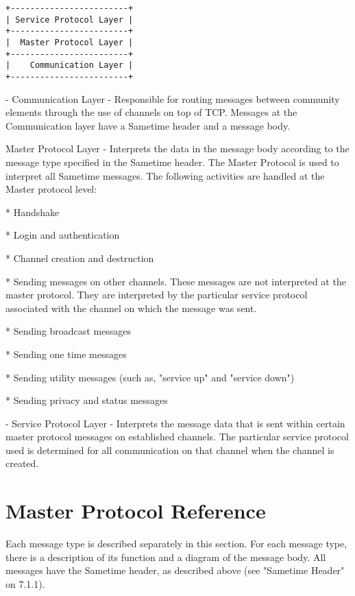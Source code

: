 \documentclass[titlepage,oneside]{book}
\begin{document}
\begin{verbatim}
+------------------------+
| Service Protocol Layer |
+------------------------+
|  Master Protocol Layer |
+------------------------+
|    Communication Layer |
+------------------------+
\end{verbatim}

\par{} - Communication Layer - Responsible for routing messages between
community elements through the use of channels on top of TCP. Messages
at the Communication layer have a Sametime header and a message body.

\par{} Master Protocol Layer - Interprets the data in the message body
according to the message type specified in the Sametime header. The
Master Protocol is used to interpret all Sametime messages. The
following   activities are handled at the Master protocol level:

\par{}     * Handshake
\par{}     * Login and authentication
\par{}     * Channel creation and destruction
\par{}     * Sending messages on other channels. These messages are not
      interpreted at the master protocol. They are interpreted by
      the particular service protocol associated with the channel
      on which the message was sent.
\par{}     * Sending broadcast messages
\par{}     * Sending one time messages
\par{}     * Sending utility messages (such as, "service up" and "service
      down")
\par{}     * Sending privacy and status messages

\par{} - Service Protocol Layer - Interprets the message data that is sent
within certain master protocol messages on established channels. The
particular service protocol used is determined for all communication on
that channel when the channel is created.

\chapter{Master Protocol Reference}

\par{} Each message type is described separately in this section. For
each message type, there is a description of its function and a
diagram of the message body. All messages have the Sametime header, as
described above (see "Sametime Header" on 7.1.1).
\end{document}
